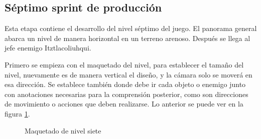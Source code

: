 
\subsection{Séptimo sprint de producción}

Esta etapa contiene el desarrollo del nivel séptimo del juego. El panorama general abarca un nivel de manera horizontal en un terreno arenoso. Después se llega al jefe enemigo Itztlacoliuhqui.

Primero se empieza con el maquetado del nivel, para establecer el tamaño del nivel, nuevamente es de manera vertical el diseño, y la cámara solo se moverá en esa dirección. Se establece también donde debe ir cada objeto o enemigo junto con anotaciones necesarias para la comprensión posterior, como son direcciones de movimiento o acciones que deben realizarse. Lo anterior se puede ver en la figura \ref{fig:n701}.
\begin{figure}[htbp]
	\centering
	\caption{Maquetado de nivel siete} \label{fig:n701}
\end{figure}  


